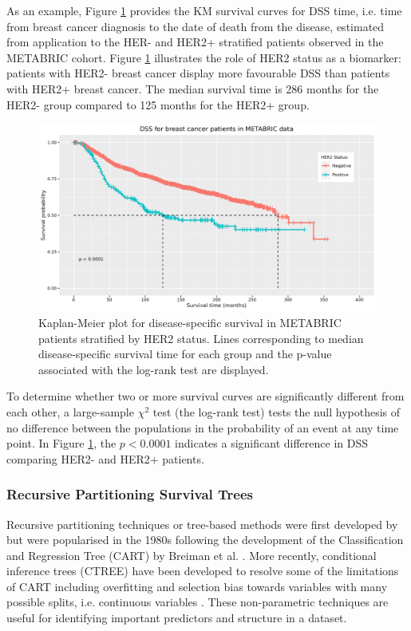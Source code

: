 As an example, Figure \ref{fig:SurvivalCurves} provides the KM survival curves for DSS time, i.e. time from breast cancer diagnosis to the date of death from the disease, estimated from application to the HER- and HER2+ stratified patients observed in the METABRIC cohort. Figure \ref{fig:SurvivalCurves} illustrates the role of HER2 status as a biomarker: patients with HER2- breast cancer display more favourable DSS than patients with HER2+ breast cancer. The median survival time is 286 months for the HER2- group compared to 125 months for the HER2+ group. 

\vfill 
\begin{figure}[!h]
\includegraphics[width=1\textwidth]{../figures/Chapter_3/Example_Survival_Curve.png}
\caption[Kaplan-Meier plot for disease specific survival in METABRIC patients stratified by HER2 status.]{Kaplan-Meier plot for disease-specific survival in METABRIC patients stratified by HER2 status. Lines corresponding to median disease-specific survival time for each group and the p-value associated with the log-rank test are displayed.}
\label{fig:SurvivalCurves}
\end{figure}
\vfill
\clearpage 

To determine whether two or more survival curves are significantly different from each other, a large-sample $\chi^2$ test (the log-rank test) tests the null hypothesis of no difference between the populations in the probability of an event at any time point. In Figure \ref{fig:SurvivalCurves}, the $p<0.0001$ indicates a significant difference in DSS comparing HER2- and HER2+ patients. 

\subsubsection{Recursive Partitioning Survival Trees}
Recursive partitioning techniques or tree-based methods were first developed by \cite{Morgan_Sonquist_1963} but were popularised in the 1980s following the development of the Classification and Regression Tree (CART) by Breiman et al. \citep{breiman_1984, bb_2011}. More recently, conditional inference trees (CTREE) have been developed to resolve some of the limitations of CART including overfitting and selection bias towards variables with many possible splits, i.e. continuous variables \citep{hothorn_hornik_zeileis_2006}. These non-parametric techniques are useful for identifying important predictors and structure in a dataset.  

